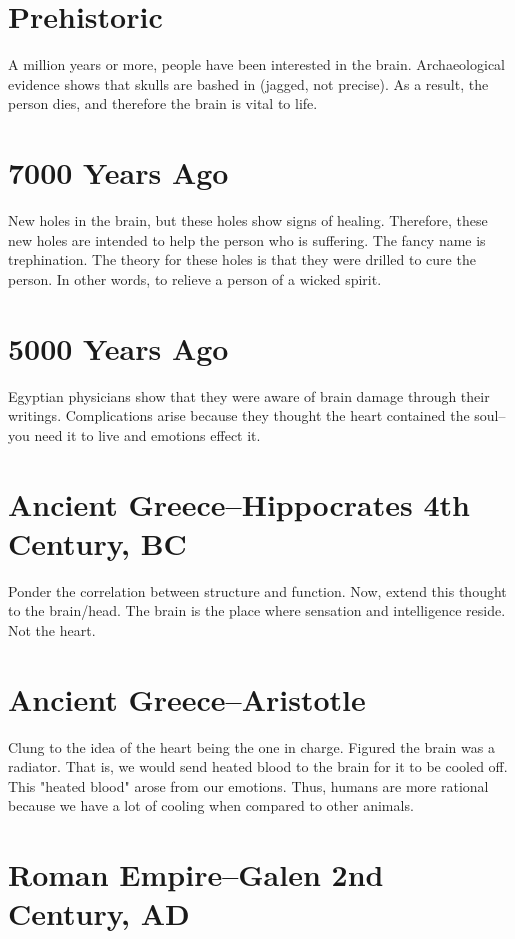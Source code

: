 \section{Prehistoric}

A million years or more, people have been interested in the brain. Archaeological evidence shows that skulls are bashed in (jagged, not precise). As a result, the person dies, and therefore the brain is vital to life. 

\section{7000 Years Ago}

New holes in the brain, but these holes show signs of healing. Therefore, these new holes are intended to help the person who is suffering.
The fancy name is trephination. 
The theory for these holes is that they were drilled to cure the person. In other words, to relieve a person of a wicked spirit. 

\section{5000 Years Ago}

Egyptian physicians show that they were aware of brain damage through their writings.
Complications arise because they thought the heart contained the soul--you need it to live and emotions effect it.

\section{Ancient Greece--Hippocrates 4th Century, BC}

Ponder the correlation between structure and function. Now, extend this thought to the brain/head.
The brain is the place where sensation and intelligence reside. Not the heart.

\section{Ancient Greece--Aristotle}

Clung to the idea of the heart being the one in charge. 
Figured the brain was a radiator. That is, we would send heated blood to the brain for it to be cooled off. This "heated blood" arose from our emotions. Thus, humans are more rational because we have a lot of cooling when compared to other animals.

\section{Roman Empire--Galen 2nd Century, AD}

